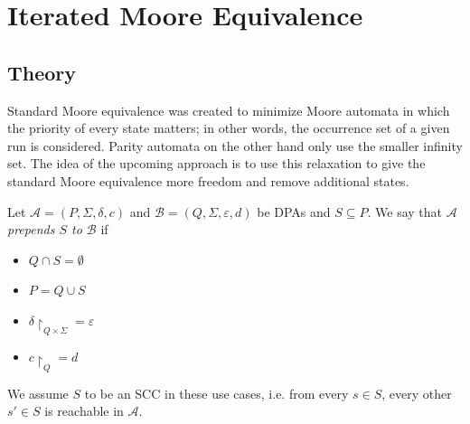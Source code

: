 
\chapter{Iterated Moore Equivalence}
\label{chap:imoore}

\section{Theory}
Standard Moore equivalence was created to minimize Moore automata in which the priority of every state matters; in other words, the occurrence set of a given run is considered. Parity automata on the other hand only use the smaller infinity set. The idea of the upcoming approach is to use this relaxation to give the standard Moore equivalence more freedom and remove additional states.

\begin{defn}
	Let $\mathcal{A} = (P, \Sigma, \delta, c)$ and $\mathcal{B} = (Q, \Sigma, \varepsilon, d)$ be DPAs and $S \subseteq P$. We say that \emph{$\mathcal{A}$ prepends $S$ to $\mathcal{B}$} if 
	\begin{itemize}
		\item $Q \cap S = \emptyset$
		\item $P = Q \cup S$
		\item $\delta\upharpoonright_{Q \times \Sigma} = \varepsilon$
		\item $c\upharpoonright_Q = d$
	\end{itemize}
	
	We assume $S$ to be an SCC in these use cases, i.e. from every $s \in S$, every other $s' \in S$ is reachable in $\mathcal{A}$.
\end{defn} 

